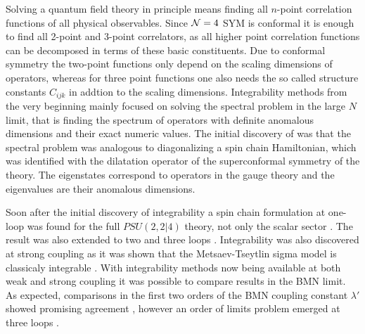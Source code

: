 \vspace{20pt}
\vspace{20pt}

Solving a quantum field theory in principle means finding all $n$-point correlation functions of all physical observables. 
Since $\mathcal{N}=4$ SYM is conformal it is enough to find all 2-point and 3-point correlators, as all higher point correlation functions can be decomposed in terms of these basic constituents.
Due to conformal symmetry the two-point functions only depend on the scaling dimensions of operators, whereas for three point functions one also needs the so called structure constants $C_{ijk}$ in addtion to the scaling dimensions.
Integrability methods from the very beginning mainly focused on solving the spectral problem in the large $N$ limit, that is finding the spectrum of operators with definite anomalous dimensions and their exact numeric values.
The initial discovery of \cite{Minahan:2002ve} was that the spectral problem was analogous to diagonalizing a spin chain Hamiltonian, which was identified with the dilatation operator of the superconformal symmetry of the theory.
The eigenstates correspond to operators in the gauge theory and the eigenvalues are their anomalous dimensions.

Soon after the initial discovery of integrability a spin chain formulation at one-loop was found for the full $PSU(2,2|4)$ theory, not only the scalar sector \cite{Beisert:2003jj}. 
The result was also extended to two and three loops \cite{Beisert:2003tq}. 
Integrability was also discovered at strong coupling as it was shown that the Metsaev-Tseytlin sigma model is classicaly integrable \cite{Bena:2003wd}. 
With integrability methods now being available at both weak and strong coupling it was possible to compare results in the BMN limit.
As expected, comparisons in the first two orders of the BMN coupling constant $\lambda'$ showed promising agreement \cite{Frolov:2003qc, Frolov:2003xy, Arutyunov:2003uj}, however an order of limits problem emerged at three loops \cite{Beisert:2003tq}. 

